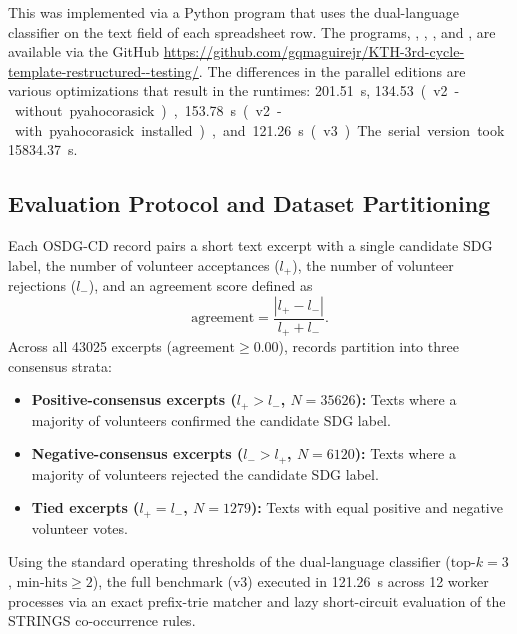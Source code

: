 This was implemented via a Python program that uses the dual-language classifier on the text field of each spreadsheet row. The programs,  , ,
, and
, are available via the GitHub \url{https://github.com/gqmaguirejr/KTH-3rd-cycle-template-restructured--testing/}. The differences in the parallel editions are various optimizations that result in the runtimes: \qty{201.51}{\second}, \qty{134.53} (v2 - without pyahocorasick), \qty{153.78}{\second} (v2 - with pyahocorasick installed), and \qty{121.26}{\second} (v3).  The serial version took \qty{15834.37}{\second}.


\subsection{Evaluation Protocol and Dataset Partitioning}

Each OSDG-CD record pairs a short text excerpt with a single candidate \gls{SDG} label, the number of volunteer acceptances ($l_{+}$), the number of volunteer rejections ($l_{-}$), and an agreement score defined as
\begin{equation}
  \text{agreement} = \frac{|l_{+} - l_{-}|}{l_{+} + l_{-}}.
\end{equation}
Across all \num{43025} excerpts ($\text{agreement} \ge 0.00$), records partition into three consensus strata:
\begin{itemize}
  \item \textbf{Positive-consensus excerpts ($l_{+} > l_{-}$, $N = \num{35626}$):} Texts where a majority of volunteers confirmed the candidate \gls{SDG} label.
  \item \textbf{Negative-consensus excerpts ($l_{-} > l_{+}$, $N = \num{6120}$):} Texts where a majority of volunteers rejected the candidate \gls{SDG} label.
  \item \textbf{Tied excerpts ($l_{+} = l_{-}$, $N = \num{1279}$):} Texts with equal positive and negative volunteer votes.
\end{itemize}

Using the standard operating thresholds of the dual-language classifier ($\text{top-}k = 3$, $\text{min-hits} \ge 2$), the full benchmark (v3) executed in \SI{121.26}{\second} across \num{12} worker processes via an exact prefix-trie matcher and lazy short-circuit evaluation of the STRINGS co-occurrence rules.

